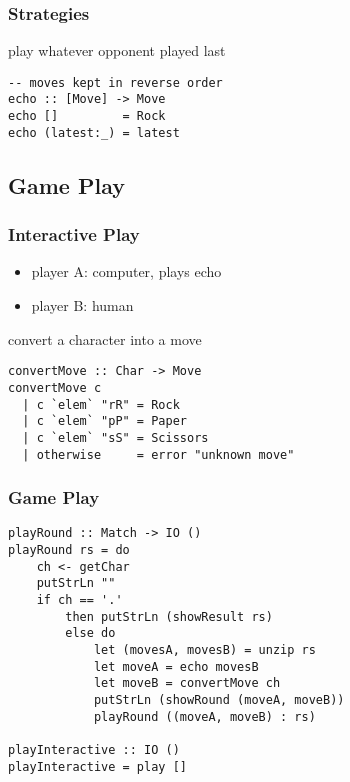\documentclass[dvipsnames]{beamer}
\theoremstyle{plain}
\begin{document}
\begin{frame}[fragile]
  \frametitle{Strategies}

  \begin{exampleblock}{play whatever opponent played last}
    \begin{lstlisting}
-- moves kept in reverse order
echo :: [Move] -> Move
echo []         = Rock
echo (latest:_) = latest
    \end{lstlisting}
  \end{exampleblock}
\end{frame}

\subsection{Game Play}

\begin{frame}[fragile]
  \frametitle{Interactive Play}

  \begin{itemize}
    \item player A: computer, plays echo
    \item player B: human
  \end{itemize}

  \begin{exampleblock}{convert a character into a move}
    \begin{lstlisting}
convertMove :: Char -> Move
convertMove c
  | c `elem` "rR" = Rock
  | c `elem` "pP" = Paper
  | c `elem` "sS" = Scissors
  | otherwise     = error "unknown move"
    \end{lstlisting}
  \end{exampleblock}
\end{frame}

\begin{frame}[fragile]
  \frametitle{Game Play}

  \begin{lstlisting}
playRound :: Match -> IO ()
playRound rs = do
    ch <- getChar
    putStrLn ""
    if ch == '.'
        then putStrLn (showResult rs)
        else do
            let (movesA, movesB) = unzip rs
            let moveA = echo movesB
            let moveB = convertMove ch
            putStrLn (showRound (moveA, moveB))
            playRound ((moveA, moveB) : rs)

playInteractive :: IO ()
playInteractive = play []
  \end{lstlisting}
\end{frame}
\end{document}
